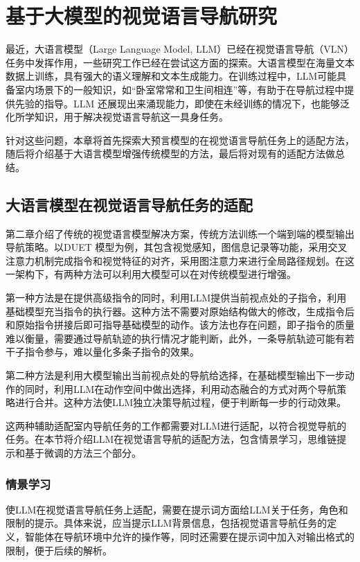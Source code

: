 \documentclass[bachelor]{thesis-uestc}
\begin{document}
\chapter{基于大模型的视觉语言导航研究}

最近，大语言模型（Large Language Model, LLM）已经在视觉语言导航（VLN）任务中发挥作用，一些研究工作已经在尝试这方面的探索。大语言模型在海量文本数据上训练，具有强大的语义理解和文本生成能力。在训练过程中，LLM可能具备室内场景下的一般知识，如“卧室常常和卫生间相连”等，有助于在导航过程中提供先验的指导。LLM 还展现出来涌现能力，即使在未经训练的情况下，也能够泛化所学知识，用于解决视觉语言导航这一具身任务。

针对这些问题，本章将首先探索大预言模型的在视觉语言导航任务上的适配方法，随后将介绍基于大语言模型增强传统模型的方法，最后将对现有的适配方法做总结。

\section{大语言模型在视觉语言导航任务的适配}

第二章介绍了传统的视觉语言模型解决方案，传统方法训练一个端到端的模型输出导航策略。以DUET 模型为例，其包含视觉感知，图信息记录等功能，采用交叉注意力机制完成指令和视觉特征的对齐，采用图注意力来进行全局路径规划。在这一架构下，有两种方法可以利用大模型可以在对传统模型进行增强。

第一种方法是在提供高级指令的同时，利用LLM提供当前视点处的子指令，利用基础模型充当指令的执行器。这种方法不需要对原始结构做大的修改，生成指令后和原始指令拼接后即可指导基础模型的动作。该方法也存在问题，即子指令的质量难以衡量，需要通过导航轨迹的执行情况才能判断，此外，一条导航轨迹可能有若干子指令参与，难以量化多条子指令的效果。

第二种方法是利用大模型输出当前视点处的导航给选择，在基础模型输出下一步动作的同时，利用LLM在动作空间中做出选择，利用动态融合的方式对两个导航策略进行合并。这种方法使LLM独立决策导航过程，便于判断每一步的行动效果。

这两种辅助适配室内导航任务的工作都需要对LLM进行适配，以符合视觉导航的任务。在本节将介绍LLM在视觉语言导航的适配方法，包含情景学习，思维链提示和基于微调的方法三个部分。

\subsection{情景学习}

使LLM在视觉语言导航任务上适配，需要在提示词方面给LLM关于任务，角色和限制的提示。具体来说，应当提示LLM背景信息，包括视觉语言导航任务的定义，智能体在导航环境中允许的操作等，同时还需要在提示词中加入对输出格式的限制，便于后续的解析。
\end{document}
